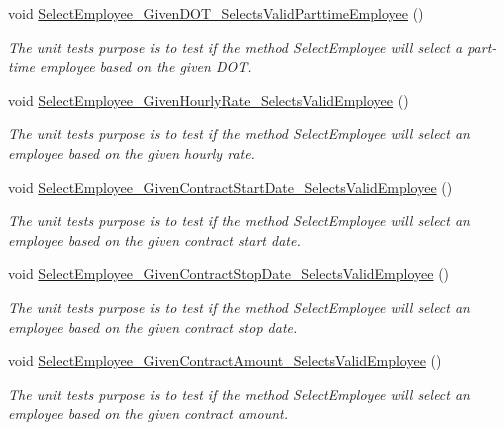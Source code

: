 \begin{DoxyCompactItemize}
void \hyperlink{class_the_company_1_1_tests_1_1_select_employee_tests_a4c5d13cc4dd227bc1961cc0284b2a284}{Select\+Employee\+\_\+\+Given\+D\+O\+T\+\_\+\+Selects\+Valid\+Parttime\+Employee} ()
\begin{DoxyCompactList}\small\item\em The unit test\textquotesingle{}s purpose is to test if the method Select\+Employee will select a part-\/time employee based on the given D\+O\+T. \end{DoxyCompactList}\item 
void \hyperlink{class_the_company_1_1_tests_1_1_select_employee_tests_a243f00fdc7457d4f3e67aadaf324f728}{Select\+Employee\+\_\+\+Given\+Hourly\+Rate\+\_\+\+Selects\+Valid\+Employee} ()
\begin{DoxyCompactList}\small\item\em The unit test\textquotesingle{}s purpose is to test if the method Select\+Employee will select an employee based on the given hourly rate. \end{DoxyCompactList}\item 
void \hyperlink{class_the_company_1_1_tests_1_1_select_employee_tests_aa4981271a6fe8b3061d4c2f45486dab1}{Select\+Employee\+\_\+\+Given\+Contract\+Start\+Date\+\_\+\+Selects\+Valid\+Employee} ()
\begin{DoxyCompactList}\small\item\em The unit test\textquotesingle{}s purpose is to test if the method Select\+Employee will select an employee based on the given contract start date. \end{DoxyCompactList}\item 
void \hyperlink{class_the_company_1_1_tests_1_1_select_employee_tests_a0839d5b1955f3701d00ce591828d7284}{Select\+Employee\+\_\+\+Given\+Contract\+Stop\+Date\+\_\+\+Selects\+Valid\+Employee} ()
\begin{DoxyCompactList}\small\item\em The unit test\textquotesingle{}s purpose is to test if the method Select\+Employee will select an employee based on the given contract stop date. \end{DoxyCompactList}\item 
void \hyperlink{class_the_company_1_1_tests_1_1_select_employee_tests_aa17b9acc8972a00aff53f159d4e75c29}{Select\+Employee\+\_\+\+Given\+Contract\+Amount\+\_\+\+Selects\+Valid\+Employee} ()
\begin{DoxyCompactList}\small\item\em The unit test\textquotesingle{}s purpose is to test if the method Select\+Employee will select an employee based on the given contract amount. \end{DoxyCompactList}\item 

\end{DoxyCompactItemize}
